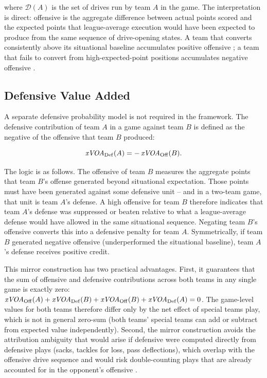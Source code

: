 where $\mathcal{D}(A)$ is the set of drives run by team $A$ in the game.
The interpretation is direct: offensive \xvoa{} is the aggregate difference
between actual points scored and the expected points that league-average
execution would have been expected to produce from the same sequence of
drive-opening states. A team that converts consistently above its situational
baseline accumulates positive offensive \xvoa{}; a team that fails to convert
from high-expected-point positions accumulates negative offensive \xvoa{}.

\subsection{Defensive Value Added}
\label{sec:def-xvoa}

A separate defensive probability model is not required in the \gds{} framework.
The defensive contribution of team $A$ in a game against team $B$ is defined
as the negative of the offensive \xvoa{} that team $B$ produced:

\begin{equation}
  \label{eq:xvoa-def}
  \textit{xVOA}{}_{\mathrm{Def}}(A) = -\,\textit{xVOA}{}_{\mathrm{Off}}(B).
\end{equation}

The logic is as follows. The offensive \xvoa{} of team $B$ measures the
aggregate points that team $B$'s offense generated beyond situational
expectation. Those points must have been generated against some defensive
unit -- and in a two-team game, that unit is team $A$'s defense. A high
offensive \xvoa{} for team $B$ therefore indicates that team $A$'s defense
was suppressed or beaten relative to what a league-average defense would have
allowed in the same situational sequence. Negating team $B$'s offensive \xvoa{}
converts this into a defensive penalty for team $A$. Symmetrically, if team $B$
generated negative offensive \xvoa{} (underperformed the situational baseline),
team $A$'s defense receives positive credit.

This mirror construction has two practical advantages. First, it guarantees
that the sum of offensive and defensive \xvoa{} contributions across both teams
in any single game is exactly zero: $\textit{xVOA}{}_{\mathrm{Off}}(A) +
\textit{xVOA}{}_{\mathrm{Def}}(B) + \textit{xVOA}{}_{\mathrm{Off}}(B) +
\textit{xVOA}{}_{\mathrm{Def}}(A) = 0$. The game-level \gds{} values for both teams
therefore differ only by the net effect of special teams play, which is not
in general zero-sum (both teams' special teams can add or subtract from
expected value independently). Second, the mirror construction avoids the
attribution ambiguity that would arise if defensive \xvoa{} were computed
directly from defensive plays (sacks, tackles for loss, pass deflections),
which overlap with the offensive drive sequence and would risk double-counting
plays that are already accounted for in the opponent's offensive \xvoa{}.

